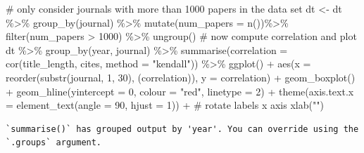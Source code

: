\documentclass[
  letterpaper,
  DIV=11,
  numbers=noendperiod]{scrreprt}
\newenvironment{Shaded}{\begin{snugshade}}{\end{snugshade}}
\newcommand{\AttributeTok}[1]{\textcolor[rgb]{0.40,0.45,0.13}{#1}}
\newcommand{\CommentTok}[1]{\textcolor[rgb]{0.37,0.37,0.37}{#1}}
\newcommand{\DecValTok}[1]{\textcolor[rgb]{0.68,0.00,0.00}{#1}}
\newcommand{\FunctionTok}[1]{\textcolor[rgb]{0.28,0.35,0.67}{#1}}
\newcommand{\NormalTok}[1]{\textcolor[rgb]{0.00,0.23,0.31}{#1}}
\newcommand{\OtherTok}[1]{\textcolor[rgb]{0.00,0.23,0.31}{#1}}
\newcommand{\SpecialCharTok}[1]{\textcolor[rgb]{0.37,0.37,0.37}{#1}}
\newcommand{\StringTok}[1]{\textcolor[rgb]{0.13,0.47,0.30}{#1}}
\begin{document}
\begin{Shaded}
\begin{Highlighting}[]
\CommentTok{\# only consider journals with more than 1000 papers in the data set}
\NormalTok{dt }\OtherTok{\textless{}{-}}\NormalTok{ dt }\SpecialCharTok{\%\textgreater{}\%} 
  \FunctionTok{group\_by}\NormalTok{(journal) }\SpecialCharTok{\%\textgreater{}\%} 
  \FunctionTok{mutate}\NormalTok{(}\AttributeTok{num\_papers =} \FunctionTok{n}\NormalTok{())}\SpecialCharTok{\%\textgreater{}\%} 
  \FunctionTok{filter}\NormalTok{(num\_papers }\SpecialCharTok{\textgreater{}} \DecValTok{1000}\NormalTok{) }\SpecialCharTok{\%\textgreater{}\%} 
  \FunctionTok{ungroup}\NormalTok{()}
\CommentTok{\# now compute correlation and plot}
\NormalTok{dt }\SpecialCharTok{\%\textgreater{}\%} 
  \FunctionTok{group\_by}\NormalTok{(year, journal) }\SpecialCharTok{\%\textgreater{}\%} 
  \FunctionTok{summarise}\NormalTok{(}\AttributeTok{correlation =} \FunctionTok{cor}\NormalTok{(title\_length, cites, }\AttributeTok{method =} \StringTok{"kendall"}\NormalTok{)) }\SpecialCharTok{\%\textgreater{}\%} 
  \FunctionTok{ggplot}\NormalTok{() }\SpecialCharTok{+} 
  \FunctionTok{aes}\NormalTok{(}\AttributeTok{x =} \FunctionTok{reorder}\NormalTok{(}\FunctionTok{substr}\NormalTok{(journal, }\DecValTok{1}\NormalTok{, }\DecValTok{30}\NormalTok{), (correlation)), }\AttributeTok{y =}\NormalTok{ correlation) }\SpecialCharTok{+} 
  \FunctionTok{geom\_boxplot}\NormalTok{() }\SpecialCharTok{+} 
  \FunctionTok{geom\_hline}\NormalTok{(}\AttributeTok{yintercept =} \DecValTok{0}\NormalTok{, }\AttributeTok{colour =} \StringTok{"red"}\NormalTok{, }\AttributeTok{linetype =} \DecValTok{2}\NormalTok{) }\SpecialCharTok{+}
  \FunctionTok{theme}\NormalTok{(}\AttributeTok{axis.text.x =} \FunctionTok{element\_text}\NormalTok{(}\AttributeTok{angle =} \DecValTok{90}\NormalTok{, }\AttributeTok{hjust =} \DecValTok{1}\NormalTok{)) }\SpecialCharTok{+}  \CommentTok{\# rotate labels x axis}
  \FunctionTok{xlab}\NormalTok{(}\StringTok{""}\NormalTok{)}
\end{Highlighting}
\end{Shaded}

\begin{verbatim}
`summarise()` has grouped output by 'year'. You can override using the
`.groups` argument.
\end{verbatim}
\end{document}
